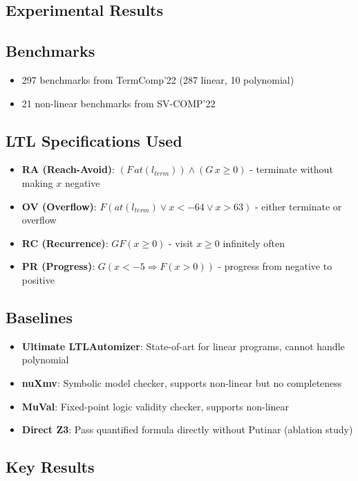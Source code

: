 \documentclass{article}
\begin{document}
\begin{enumerate}
\section{Experimental Results}

\subsection{Benchmarks}
\begin{itemize}
    \item 297 benchmarks from TermComp'22 (287 linear, 10 polynomial)
    \item 21 non-linear benchmarks from SV-COMP'22
\end{itemize}

\subsection{LTL Specifications Used}
\begin{itemize}
    \item \textbf{RA (Reach-Avoid)}: $(F\,at(l_{term})) \land (G\,x \geq 0)$ - terminate without making $x$ negative
    \item \textbf{OV (Overflow)}: $F(at(l_{term}) \lor x < -64 \lor x > 63)$ - either terminate or overflow
    \item \textbf{RC (Recurrence)}: $G F(x \geq 0)$ - visit $x \geq 0$ infinitely often
    \item \textbf{PR (Progress)}: $G(x < -5 \Rightarrow F(x > 0))$ - progress from negative to positive
\end{itemize}

\subsection{Baselines}
\begin{itemize}
    \item \textbf{Ultimate LTLAutomizer}: State-of-art for linear programs, cannot handle polynomial
    \item \textbf{nuXmv}: Symbolic model checker, supports non-linear but no completeness
    \item \textbf{MuVal}: Fixed-point logic validity checker, supports non-linear
    \item \textbf{Direct Z3}: Pass quantified formula directly without Putinar (ablation study)
\end{itemize}

\subsection{Key Results}


\end{enumerate}
\end{document}
